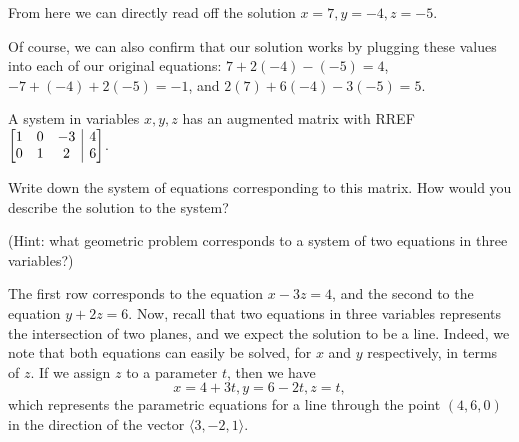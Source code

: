 \documentclass[12pt]{exam}
\makeatletter
\newenvironment{amatrix}[1]{%
  \left[\begin{array}{@{}*{#1}{c}|c@{}}
}{%
  \end{array}\right]
}
\newcommand{\di}{\displaystyle}
\newcommand{\bam}{\begin{amatrix}}
\newcommand{\eam}{\end{amatrix}}
\makeatother
\begin{document}
\begin{questions}
\begin{solution}[10cm]
From here we can directly read off the solution $x=7, y=-4, z=-5$.

Of course, we can also confirm that our solution works by plugging these values into each of our original equations: $7+2(-4)-(-5)=4$, $-7+(-4)+2(-5)=-1$, and $2(7)+6(-4)-3(-5) = 5$.
\end{solution}


\question A system in variables $x,y,z$ has an augmented matrix with RREF $\di \bam{3} 1&0&-3&4\\0&1&2&6\eam$.

Write down the system of equations corresponding to this matrix. How would you describe the solution to the system?

(Hint: what geometric problem corresponds to a system of two equations in three variables?)
\begin{solution}
The first row corresponds to the equation $x-3z=4$, and the second to the equation $y+2z=6$. Now, recall that two equations in three variables represents the intersection of two planes, and we expect the solution to be a line. Indeed, we note that both equations can easily be solved, for $x$ and $y$ respectively, in terms of $z$. If we assign $z$ to a parameter $t$, then we have
\[
x=4+3t, y=6-2t, z=t,
\]
which represents the parametric equations for a line through the point $(4,6,0)$ in the direction of the vector $\langle 3,-2,1\rangle$.
\end{solution}

  \end{questions}
\end{document}
